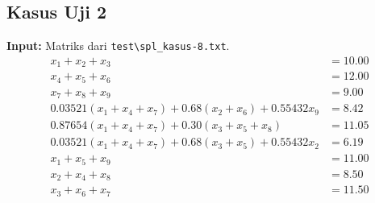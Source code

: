 \documentclass[12pt,a4paper]{report}
\begin{document}
\subsection{Kasus Uji 2}
\textbf{Input:} Matriks dari \texttt{test\textbackslash spl\_kasus-8.txt}.
\begin{align*}
x_1 + x_2 + x_3 &= 10.00 \\
x_4 + x_5 + x_6 &= 12.00 \\
x_7 + x_8 + x_9 &= 9.00 \\
0.03521(x_1 + x_4 + x_7) + 0.68(x_2 + x_6) + 0.55432x_9 &= 8.42 \\
0.87654(x_1 + x_4 + x_7) + 0.30(x_3 + x_5 + x_8) &= 11.05 \\
0.03521(x_1 + x_4 + x_7) + 0.68(x_3 + x_5) + 0.55432x_2 &= 6.19 \\
x_1 + x_5 + x_9 &= 11.00 \\
x_2 + x_4 + x_8 &= 8.50 \\
x_3 + x_6 + x_7 &= 11.50
\end{align*}
\end{document}

